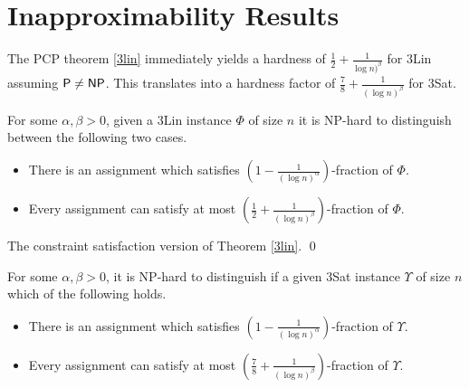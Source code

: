 \section{Inapproximability Results}

The PCP theorem \ref{3lin} immediately yields a hardness of $\frac{1}{2} +
\frac{1}{\log n)^\beta}$ for {\sc 3Lin} assuming ${\sf P \ne NP}$. This
translates into a hardness factor of
$\frac{7}{8} + \frac{1}{(\log n)^\beta}$ for {\sc 3Sat}.\\

\begin{corollary}
  For some $\alpha, \beta > 0$, given a {\sc 3Lin} instance $\Phi$ of
  size $n$ it is {\sf NP}-hard to distinguish between the following
  two cases.
\begin{itemize}
\item There is an assignment which satisfies $(1 - \frac{1}{(\log n)^\alpha})$-fraction of $\Phi$.
\item Every assignment can satisfy at most $(\frac{1}{2} + \frac{1}{(\log
      n)^{\beta}})$-fraction of $\Phi$.
\end{itemize}
\end{corollary}
 The constraint satisfaction version of Theorem
\ref{3lin}. \qed \\

\begin{corollary}
  For some $\alpha, \beta > 0$, it is {\sf NP}-hard to distinguish if a given 
{\sc 3Sat} instance $\Upsilon$  of size $n$ which of the following holds.
\begin{itemize}
\item There is an assignment which satisfies $(1 -
    \frac{1}{(\log n)^\alpha})$-fraction of $\Upsilon$.
\item Every assignment can satisfy at most $(\frac{7}{8} + \frac{1}{(\log n)^{\beta}})$-fraction of $\Upsilon$.
\end{itemize}
\end{corollary}

